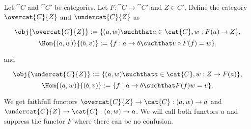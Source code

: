 \begin{definition}
Let $\cat{C}$ and $\cat{C'}$ be categories. 
Let $F:\cat{C}\rightarrow \cat{C'}$ and $Z\in C'$. 
Define the category $\overcat{C}{Z}$ and $\undercat{C}{Z}$ as 

\[\obj{\overcat{C}{Z}} := \{(a,w) \suchthat a\in \cat{C}, w:F(a)\rightarrow Z\},\]
\[\Hom{(a,w)}{(b,v)} := \{f:a\rightarrow b \suchthat v\circ F(f) = w  \},\]

and

\[\obj{\undercat{C}{Z}} := \{(a,w) \suchthat a\in \cat{C}, w:Z\rightarrow F(a)\},\]
\[\Hom{(a,w)}{(b,v)} := \{f:a\rightarrow b \suchthat F(f)w = v  \}.\]

We get faithfull functors 
$\overcat{C}{Z} \rightarrow \cat{C}: (a,w)\rightarrow a$ 
and 
$\undercat{C}{Z} \rightarrow \cat{C}: (a,w)\rightarrow a$.
We will call both functors $u$ and suppress the functor $F$ where there can be no confusion.
\end{definition}